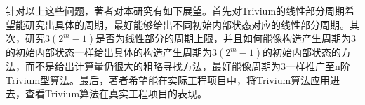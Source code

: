 \begin{summary}
针对以上这些问题，著者对本研究有如下展望。首先对Trivium的线性部分周期希望能研究出具体的周期，最好能够给出不同初始内部状态对应的线性部分周期。其次，研究$3(2^{m}-1)$是否为线性部分的周期上限，并且如何能像构造产生周期为3的初始内部状态一样给出具体的构造产生周期为$3(2^{m}-1)$的初始内部状态的方法，而不是给出计算量仍很大的粗略寻找方法，最好能像周期为3一样推广至n阶Trivium型算法。最后，著者希望能在实际工程项目中，将Trivium算法应用进去，查看Trivium算法在真实工程项目的表现。

\end{summary}
